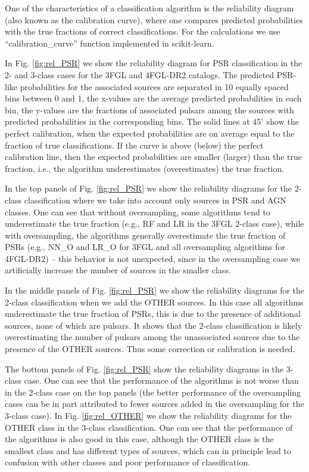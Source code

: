 One of the characteristics of a classification algorithm is the reliability diagram (also known as the calibration curve),
where one compares predicted probabilities with the true fractions of correct classifications.
For the calculations we use ``calibration\_curve'' function implemented in scikit-learn.

In Fig. \ref{fig:rel_PSR} we show the reliability diagram for PSR classification in the 2- and 3-class cases
for the 3FGL and 4FGL-DR2 catalogs.
The predicted PSR-like probabilities for the associated sources are separated in 10 equally spaced bins between 0 and 1, 
the x-values are the average predicted probabilities in each bin,
the y-values are the fractions of associated pulsars among the sources with predicted probabilities 
in the corresponding bins.
The solid lines at $45^\circ$ show the perfect calibration, when the expected probabilities are on average equal to the 
fraction of true classifications.
If the curve is above (below) the perfect calibration line, then the expected probabilities are smaller (larger) than the true fraction,
i.e., the algorithm underestimates (overestimates) the true fraction.


In the top panels of Fig. \ref{fig:rel_PSR} we show the reliability diagrams for the 2-class classification
where we take into account only sources in PSR and AGN classes.
One can see that without oversampling, some algorithms tend to underestimate the true fraction (e.g., RF and LR in the 3FGL 2-class case),
while with oversampling, the algorithms generally overestimate the true fraction of PSRs (e.g., NN\_O and LR\_O for 3FGL and all oversampling algorithms for 4FGL-DR2) -- this behavior is not unexpected, since in the oversampling case we artificially increase the number of sources in the smaller class.

In the middle panels of Fig. \ref{fig:rel_PSR} we show the reliability diagrams  for the 2-class classification
when we add the OTHER sources.
In this case all algorithms underestimate the true fraction of PSRs, this is due to the presence of additional sources,
none of which are pulsars.
It shows that the 2-class classification is likely overestimating the number of pulsars among the unassociated sources
due to the presence of the OTHER sources.
Thus some correction or calibration is needed.

The bottom panels of Fig. \ref{fig:rel_PSR} show the reliability diagrams in the 3-class case.
One can see that the performance of the algorithms is not worse than in the 2-class case on the top panels
(the better performance of the oversampling cases can be in part attributed to fewer sources added in the oversampling
for the 3-class case).
In Fig. \ref{fig:rel_OTHER} we show the reliability diagrams for the OTHER class in the 3-class classification.
One can see that the performance of the algorithms is also good in this case, although the OTHER class is the smallest class
and has different types of sources, which can in principle lead to confusion with other classes
and poor performance of classification.

